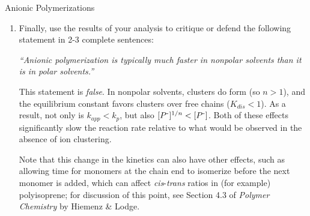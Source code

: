 \begin{activity}{Anionic Polymerizations}
\begin{exercises}
\begin{enumerate}
			\item Finally, use the results of your analysis to critique or defend the following statement in 2-3 complete sentences:
			
			\emph{``Anionic polymerization is typically much faster in nonpolar solvents than it is in polar solvents.''}
				
				\begin{solution}{}
					This statement is \emph{false}.  In nonpolar solvents, clusters do form (so $n > 1$), and the equilibrium constant favors clusters over free chains ($K_{dis}< 1$).  As a result, not only is $k_{app}<k_p$, but also $[P\textsuperscript{-}]^{1/n} < [P\textsuperscript{-}]$.  Both of these effects significantly slow the reaction rate relative to what would be observed in the absence of ion clustering.
					
					Note that this change in the kinetics can also have other effects, such as allowing time for monomers at the chain end to isomerize before the next monomer is added, which can affect \emph{cis}-\emph{trans} ratios in (for example) polyisoprene; for discussion of this point, see Section 4.3 of \emph{Polymer Chemistry} by Hiemenz \& Lodge.
				\end{solution}
				
		\end{enumerate}

	
\end{exercises}


%
%	


	
\end{activity}